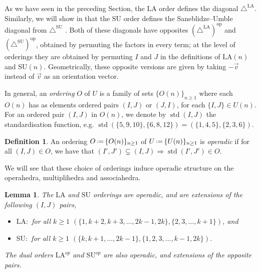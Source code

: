 \documentclass{amsart}
\newcommand{\Guillaume}[1]{\todo[color=magenta!30]{\rm #1 \\ \hfill --- G.}}
\newtheorem{lemma}[theorem]{Lemma}
\theoremstyle{definition}
\newtheorem{definition}[theorem]{Definition}
\newcommand{\eqdef}{\mbox{\,\raisebox{0.2ex}{\scriptsize\ensuremath{\mathrm:}}\ensuremath{=}\,}} %
\renewcommand{\implies}{\Rightarrow} %
\DeclareMathOperator{\std}{std}
\newcommand{\SU}{\mathrm{SU}}
\newcommand{\LA}{\mathrm{LA}}
\newcommand{\SUD}{\triangle^{\mathrm{SU}}}
\newcommand{\LAD}{\triangle^{\mathrm{LA}}}
\newcommand{\op}{\mathrm{op}}
\begin{document}
As we have seen in the preceding Section, the $\LA$ order defines the diagonal $\LAD$. 
Similarly, we will show in \Guillaume{Corollary X} that the $\SU$ order defines the Saneblidze--Umble diagonal from $\SUD$ \cite{SaneblidzeUmble04}.
Both of these diagonals have opposites $(\LAD)^{\op}$ and $(\SUD)^{\op}$, obtained by permuting the factors in every term; at the level of orderings they are obtained by permuting $I$ and $J$ in the definitions of $\LA(n)$ and $\SU(n)$. 
Geometrically, these opposite versions are given by taking $-\vec v$ instead of $\vec v$ as an orientation vector. 

In general, an \emph{ordering} $O$ of $U$ is a family of sets $\{O(n)\}_{n\geq 1}$ where each $O(n)$ has as elements ordered pairs $(I,J)$ or $(J,I)$, for each $\{I,J\} \in U(n)$.
For an ordered pair $(I,J)$ in $O(n)$, we denote by $\std(I,J)$ the standardisation function, e.g. $\std(\{5,9,10\},\{6,8,12\}) = (\{1,4,5\},\{2,3,6\})$.

\begin{definition}
    \label{def:operadic-ordering}
An ordering $O \eqdef \{O(n)\}_{n \geq 1}$ of $U \eqdef \{U(n)\}_{n\geq 1}$ is \emph{operadic} if for all $(I,J) \in O$, we have that $(I',J') \subsetneq (I,J) \implies \std(I',J') \in O$. 
\end{definition}

We will see \Guillaume{in prop X} that these choice of orderings induce operadic structure on the operahedra, multiplihedra and associahedra.

\begin{lemma} \label{lem:operadic-ordering}
The $\LA$ and $\SU$ orderings are operadic, and are extensions of the following $(I,J)$ pairs,
\begin{itemize}
    \item $\LA :$ for all $k\geq 1$  $(\{1,k+2,k+3,\dots,2k-1,2k\}, \{2,3,\dots,k+1\})$, and 
    \item $\SU :$ for all $k\geq 1$  $(\{k,k+1,\dots,2k-1\},\{1,2,3,\dots,k-1,2k\})$. 
\end{itemize}
The dual orders $\LA^{op}$ and $\SU^{op}$ are also operadic, and extensions of the opposite pairs.
\end{lemma}
\end{document}
